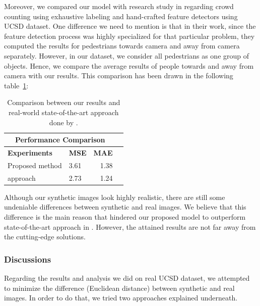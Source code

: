 \noindent Moreover, we compared our model with \citeauthor*{chan2008privacy} research study in \cite{chan2008privacy} regarding crowd counting using exhaustive labeling and hand-crafted feature detectors using UCSD dataset. One difference we need to mention is that in their work, since the feature detection process was highly specialized for that particular problem, they computed the results for pedestrians towards camera and away from camera separately. However, in our dataset, we consider all pedestrians as one group of objects. Hence, we compare the average results of people towards and away from camera with our results. This comparison has been drawn in the following table~\ref{finalres}:

\begin{table}[H]
\centering
\small\sffamily
\begin{tabular}{llrr}
\multicolumn{3}{c}{\textbf{\textbf{Performance Comparison}}} \\
\bottomrule
\textbf{Experiments} &\textbf{MSE} &\textbf{MAE} \\
\bottomrule
Proposed method                  &  3.61 & 1.38      \\
\citet{chan2008privacy} approach &  2.73 & 1.24      \\
\bottomrule
\end{tabular}
\caption{Comparison between our results and real-world state-of-the-art approach done by \citet{chan2008privacy}.}
\label{finalres}
\end{table} 

 Although our synthetic images look highly realistic, there are still some undeniable differences between synthetic and real images. We believe that this difference is the main reason that hindered our proposed model to outperform state-of-the-art approach in \cite{chan2008privacy}. However, the attained results are not far away from the cutting-edge solutions.
 
\subsubsection{Discussions}

Regarding the results and analysis we did on real UCSD dataset, we attempted to minimize the difference (Euclidean distance) between synthetic and real images. In order to do that, we tried two approaches explained underneath. 


